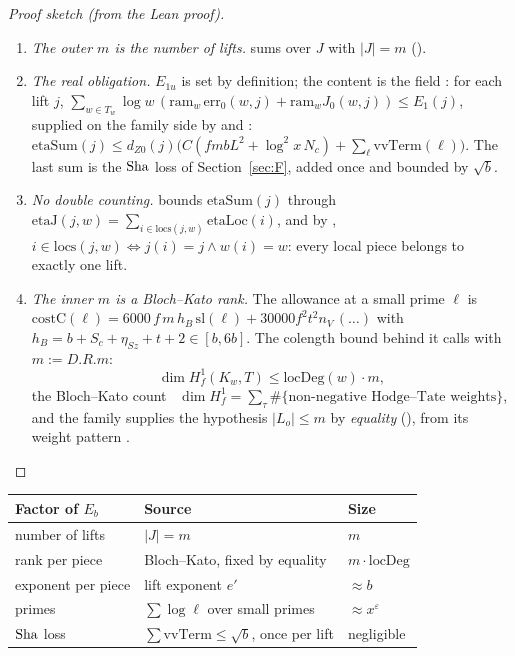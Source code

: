 \documentclass[11pt]{article}
\newcommand{\eps}{\varepsilon}
\theoremstyle{plain}
\theoremstyle{definition}
\newenvironment{sketch}{\begin{proof}[Proof sketch (from the Lean proof)]}{\end{proof}}
\begin{document}
\begin{sketch}
\begin{enumerate}
\item \emph{The outer $m$ is the number of lifts.}  sums over $J$ with
  $|J|=m$ ().
\item \emph{The real obligation.} $E_{1u}$ is set by definition; the content is the field
  : for each lift $j$,
  $\sum_{w\in T_w}\log w\,(\mathrm{ram}_w\,\mathrm{err}_0(w,j)+\mathrm{ram}_w J_0(w,j))\le E_1(j)$,
  supplied on the family side by  and :
  $\mathrm{etaSum}(j)\le d_{Z0}(j)\bigl(C(fmbL^2+\log^2x\,N_c)+\sum_\ell\mathrm{vvTerm}(\ell)\bigr)$.
  The last sum is the $\mathrm{Sha}$ loss of Section~\ref{sec:F}, added once and bounded by $\sqrt b$.
\item \emph{No double counting.}  bounds $\mathrm{etaSum}(j)$ through
  $\mathrm{etaJ}(j,w)=\sum_{i\in\mathrm{locs}(j,w)}\mathrm{etaLoc}(i)$, and by
  , $i\in\mathrm{locs}(j,w)\iff j(i)=j\wedge w(i)=w$: every local piece
  belongs to exactly one lift.
\item \emph{The inner $m$ is a Bloch--Kato rank.} The allowance at a small prime $\ell$ is
  $\mathrm{costC}(\ell)=6000\,f\,m\,h_B\,\mathrm{sl}(\ell)+30000f^2t^2n_V\,(\dots)$ with
  $h_B=b+S_c+\eta_{Sz}+t+2\in[b,6b]$. The colength bound behind it calls  with
  $m:=D.R.m$:
  \[
  \dim H^1_f(K_w,T)\le\mathrm{locDeg}(w)\cdot m,
  \]
  the Bloch--Kato count~\cite{bloch-kato} $\dim H^1_f=\sum_\tau\#\{\text{non-negative Hodge--Tate weights}\}$, and the
  family supplies the hypothesis $|L_o|\le m$ by \emph{equality} (), from its weight
  pattern .
\end{enumerate}
\end{sketch}

\begin{center}
\renewcommand{\arraystretch}{1.15}
\begin{tabular}{@{}lll@{}}
\toprule
Factor of $E_b$ & Source & Size\\
\midrule
number of lifts & $|J|=m$ & $m$\\
rank per piece & Bloch--Kato, fixed by equality & $m\cdot\mathrm{locDeg}$\\
exponent per piece & lift exponent $e'$ & $\approx b$\\
primes & $\sum\log\ell$ over small primes & $\approx x^\eps$\\
$\mathrm{Sha}$ loss & $\sum\mathrm{vvTerm}\le\sqrt b$, once per lift & negligible\\
\bottomrule
\end{tabular}
\end{center}
\end{document}
